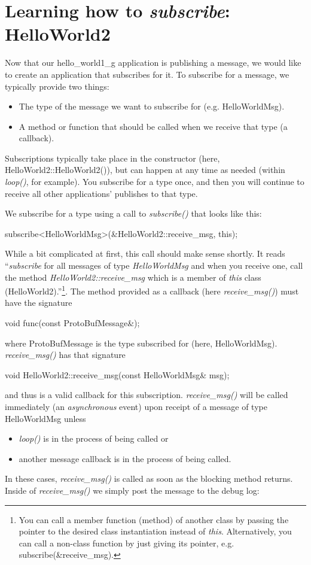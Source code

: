 \documentclass[11pt, letterpaper, oneside]{memoir}
\begin{document}
\section{Learning how to \textit{subscribe}: HelloWorld2} \label{sec:sub_ex}

Now that our hello\_world1\_g application is publishing a message, we would like to create an application that subscribes for it. To subscribe for a message, we typically provide two things:
\begin{itemize}
\item The type of the message we want to subscribe for (e.g. HelloWorldMsg).
\item A method or function that should be called when we receive that type (a callback).
\end{itemize}

Subscriptions typically take place in the constructor (here, HelloWorld2::HelloWorld2()), but can happen at any time as needed (within \textit{loop()}, for example). You subscribe for a type once, and then you will continue to receive all other applications' publishes to that type.

We subscribe for a type using a call to \textit{subscribe()} that looks like this:
\begin{boxedverbatim}
subscribe<HelloWorldMsg>(&HelloWorld2::receive_msg, this);
\end{boxedverbatim}
\resetbvlinenumber

While a bit complicated at first, this call should make sense shortly. It reads ``\textit{subscribe} for all messages of type \textit{HelloWorldMsg} and when you receive one, call the method \textit{HelloWorld2::receive\_msg} which is a member of \textit{this} class (HelloWorld2).''\footnote{You can call a member function (method) of another class by passing the pointer to the desired class instantiation instead of \textit{this}. Alternatively, you can call a non-class function by just giving its pointer, e.g. subscribe(\&receive\_msg).}. The method provided as a callback (here \textit{receive\_msg()}) must have the signature
\begin{boxedverbatim}
void func(const ProtoBufMessage&); 
\end{boxedverbatim}
\resetbvlinenumber
where ProtoBufMessage is the type subscribed for (here, HelloWorldMsg). \textit{receive\_msg()} has that signature
\begin{boxedverbatim}
void HelloWorld2::receive_msg(const HelloWorldMsg& msg);
\end{boxedverbatim}
\resetbvlinenumber
and thus is a valid callback for this subscription. \textit{receive\_msg()} will be called immediately (an \textit{asynchronous} event) upon receipt of a message of type HelloWorldMsg unless
\begin{itemize}
\item \textit{loop()} is in the process of being called or
\item another message callback is in the process of being called.
\end{itemize}
In these cases, \textit{receive\_msg()} is called as soon as the blocking method returns. Inside of \textit{receive\_msg()} we simply post the message to the debug log:
\end{document}
